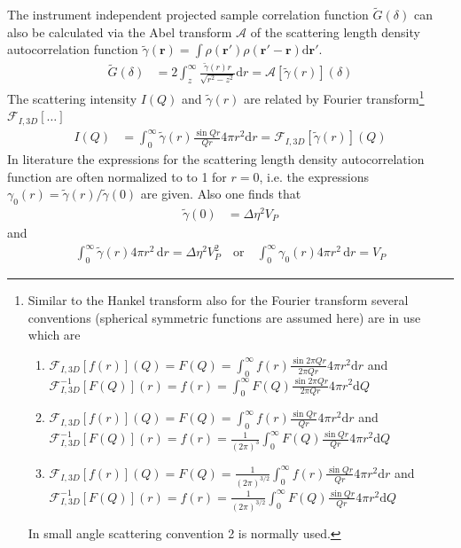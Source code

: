 The instrument independent projected sample correlation function $\tilde{G}(\delta)$ can also be calculated via the Abel transform $\mathcal{A}$ of the scattering length density autocorrelation function $\tilde{\gamma}(\mathbf{r})=\int \rho(\mathbf{r'})\rho(\mathbf{r'-r})\mathrm{d}\mathbf{r'}$.
\begin{align}
\tilde{G}(\delta) &= 2 \int_z^\infty \frac{\tilde{\gamma}(r) r}{\sqrt{r^2-z^2}} \mathrm{d}r = \mathcal{A}\left[\tilde{\gamma}(r)\right](\delta)
\end{align}
The scattering intensity $I(Q)$ and  $\tilde{\gamma}(r)$ are related by Fourier transform\footnote{\label{footnote:Fourier}Similar to the Hankel transform also for the Fourier transform several conventions (spherical symmetric functions are assumed here) are in use which are
\begin{enumerate}
\item $\mathcal{F}_{I,3D}[f(r)](Q)=F(Q)=\int_0^\infty f(r) \frac{\sin 2\pi Qr}{2\pi Qr}4\pi r^2\mathrm{d}r$ and \\ $\mathcal{F}_{I,3D}^{-1}[F(Q)](r)=f(r)=\int_0^\infty F(Q) \frac{\sin 2\pi Qr}{2\pi Qr}4\pi r^2\mathrm{d}Q$
\item $\mathcal{F}_{I,3D}[f(r)](Q)=F(Q)=\int_0^\infty f(r) \frac{\sin Qr}{Qr}4\pi r^2\mathrm{d}r$ and \\ $\mathcal{F}_{I,3D}^{-1}[F(Q)](r)=f(r)=\frac{1}{(2\pi)^3}\int_0^\infty F(Q) \frac{\sin Qr}{Qr}4\pi r^2\mathrm{d}Q$
\item $\mathcal{F}_{I,3D}[f(r)](Q)=F(Q)=\frac{1}{(2\pi)^{3/2}}\int_0^\infty f(r) \frac{\sin Qr}{ Qr}4\pi r^2\mathrm{d}r$ and \\ $\mathcal{F}_{I,3D}^{-1}[F(Q)](r)=f(r)=\frac{1}{(2\pi)^{3/2}}\int_0^\infty F(Q) \frac{\sin Qr}{Qr}4\pi r^2\mathrm{d}Q$
\end{enumerate}
In small angle scattering convention 2 is normally used.
} $\mathcal{F}_{I,3D}[\ldots]$
\begin{align}
I(Q) &= \int_0^\infty \tilde{\gamma}(r) \frac{\sin Qr}{Qr}4\pi r^2\mathrm{d}r =
\mathcal{F}_{I,3D}\left[\tilde{\gamma}(r)\right](Q)
\end{align}
In literature the expressions for the scattering length density autocorrelation function are often normalized to to 1 for $r=0$, i.e. the expressions $\gamma_0(r)=\tilde{\gamma}(r)/\tilde{\gamma}(0)$ are given. Also one finds that
\begin{align}
\tilde{\gamma}(0)&=\Delta\eta^2 V_P
\end{align}
and
\begin{align}
\int_0^\infty \tilde{\gamma}(r) 4\pi r^2 \, \mathrm{d}r =\Delta\eta^2 V_P^2 \quad \mbox{or} \quad  \int_0^\infty \gamma_0(r) 4\pi r^2 \, \mathrm{d}r = V_P
\end{align}
